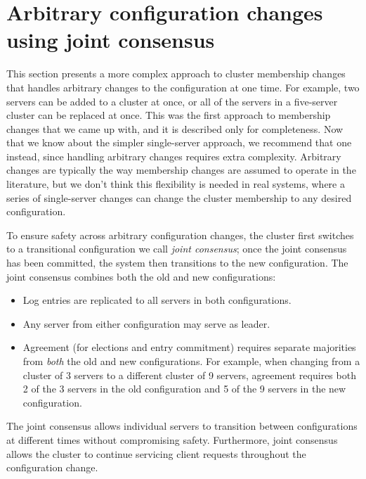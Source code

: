 \section{Arbitrary configuration changes using joint consensus}
\label{membership:arbitrary}

This section presents a more complex approach to cluster membership
changes that handles arbitrary changes to the configuration at one time.
For example, two servers can be added to a cluster at once, or all of
the servers in a five-server cluster can be replaced at once. This was
the first approach to membership changes that we came up with, and it is
described only for completeness. Now that we know about the simpler
single-server approach, we recommend that one instead, since handling
arbitrary changes requires extra complexity. Arbitrary changes are
typically the way membership changes are assumed to operate in the
literature, but we don't think this flexibility is needed in real
systems, where a series of single-server changes can change the cluster
membership to any desired configuration. 


To ensure safety across arbitrary configuration changes,
the cluster first switches to a transitional
configuration we call \emph{joint consensus}; once the joint consensus
has been committed, the system then transitions to the new
configuration. The joint consensus
combines both the old and new configurations:
\begin{itemize}
\item Log entries are replicated to all servers in both configurations.
\item Any server from either configuration may serve as leader.
\item Agreement (for elections and entry commitment) requires
separate majorities from \emph{both} the old and new configurations.
For example, when changing from a cluster of 3 servers to a
different cluster of 9 servers, agreement requires both 2 of
the 3 servers in the old configuration and 5 of the 9 servers in the new
configuration.
\end{itemize}
The joint consensus allows individual
servers to transition between configurations at different times
without compromising safety. Furthermore, joint
consensus allows the cluster to continue servicing client requests
throughout the configuration change.

